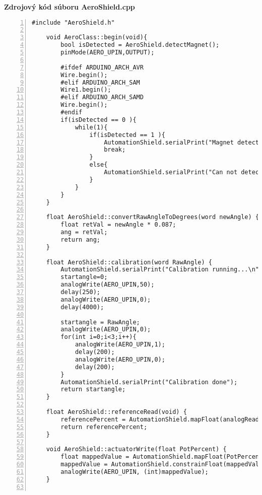 \LARGE\bf{Zdrojový kód súboru AeroShield.cpp}
\label{AeroShield.cpp}
\vspace{1cm}
\begin{lstlisting}[numbers=left,basicstyle=\tiny,caption={Zdrojový kód súboru AeroShield.cpp.},captionpos=b]	
	#include "AeroShield.h"     
	
	void AeroClass::begin(void){                     
		bool isDetected = AeroShield.detectMagnet();
		pinMode(AERO_UPIN,OUTPUT);  
		
		#ifdef ARDUINO_ARCH_AVR  
		Wire.begin();                                      
		#elif ARDUINO_ARCH_SAM 
		Wire1.begin();     
		#elif ARDUINO_ARCH_SAMD   
		Wire.begin();    
		#endif
		if(isDetected == 0 ){ 
			while(1){     
				if(isDetected == 1 ){  
					AutomationShield.serialPrint("Magnet detected \n");
					break;
				}
				else{      
					AutomationShield.serialPrint("Can not detect magnet \n"); 
				}
			}
		}       
	} 
	
	float AeroShield::convertRawAngleToDegrees(word newAngle) {
		float retVal = newAngle * 0.087;      
		ang = retVal;                               
		return ang;                  
	}
	
	float AeroShield::calibration(word RawAngle) {      
		AutomationShield.serialPrint("Calibration running...\n");  
		startangle=0;                                
		analogWrite(AERO_UPIN,50);              
		delay(250);                              
		analogWrite(AERO_UPIN,0);              
		delay(4000);    
		
		startangle = RawAngle;                                 
		analogWrite(AERO_UPIN,0);                     
		for(int i=0;i<3;i++){                  
			analogWrite(AERO_UPIN,1);                 
			delay(200);                           
			analogWrite(AERO_UPIN,0);                                
			delay(200);                                     
		}
		AutomationShield.serialPrint("Calibration done");
		return startangle;                                         
	}
	
	float AeroShield::referenceRead(void) {                                                
		referencePercent = AutomationShield.mapFloat(analogRead(AERO_RPIN), 0.0, 1024.0, 0.0, 100.0);   
		return referencePercent;                                     
	}
	
	void AeroShield::actuatorWrite(float PotPercent) {       
		float mappedValue = AutomationShield.mapFloat(PotPercent, 0.0, 100.0, 0.0, 255.0);  
		mappedValue = AutomationShield.constrainFloat(mappedValue, 0.0, 255.0);
		analogWrite(AERO_UPIN, (int)mappedValue);    
	}
	

\end{lstlisting}
